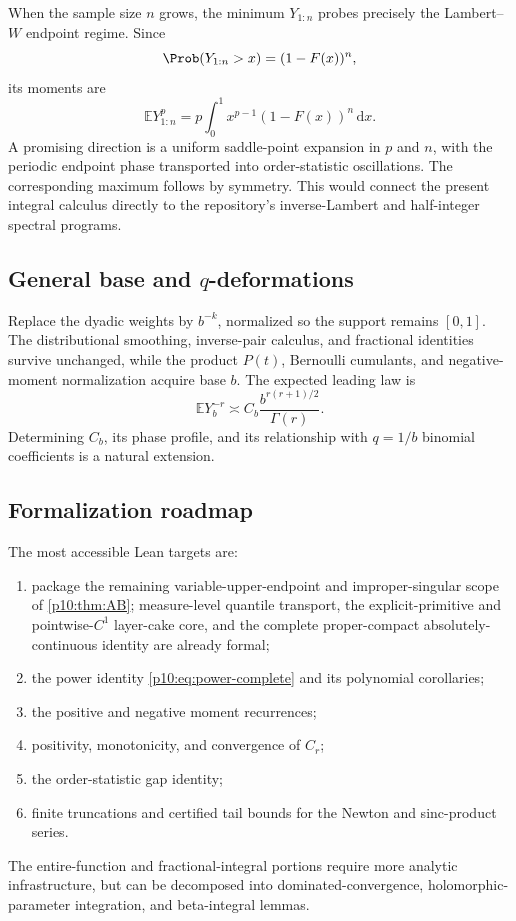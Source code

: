 \documentclass[11pt,oneside]{article}
\theoremstyle{definition}
\theoremstyle{remark}
\newcommand{\F}{F}
\newcommand{\E}{\mathbb E}
\newcommand{\dd}{\,\mathrm d}
\newcommand{\1}{\mathbf 1}
\begin{document}
When the sample size \(n\) grows, the minimum \(Y_{1:n}\) probes precisely the
Lambert--\(W\) endpoint regime.  Since
\[
 \Prob(Y_{1:n}>x)=(1-\F(x))^n,
\]
its moments are
\begin{equation}\label{p10:eq:min-order-moment}
 \E Y_{1:n}^p=p\int_0^1x^{p-1}(1-\F(x))^n\dd x.
\end{equation}
A promising direction is a uniform saddle-point expansion in \(p\) and \(n\), with the
periodic endpoint phase transported into order-statistic oscillations.  The corresponding
maximum follows by symmetry.  This would connect the present integral calculus directly
to the repository's inverse-Lambert and half-integer spectral programs.

\subsection{General base and \texorpdfstring{\(q\)}{q}-deformations}

Replace the dyadic weights by \(b^{-k}\), normalized so the support remains \([0,1]\).
The distributional smoothing, inverse-pair calculus, and fractional identities survive
unchanged, while the product \(P(t)\), Bernoulli cumulants, and negative-moment
normalization acquire base \(b\).  The expected leading law is
\begin{equation}\label{p10:eq:baseb-heuristic}
 \E Y_b^{-r}
 \asymp C_b\frac{b^{r(r+1)/2}}{\Gamma(r)}.
\end{equation}
Determining \(C_b\), its phase profile, and its relationship with \(q=1/b\) binomial
coefficients is a natural extension.

\subsection{Formalization roadmap}

The most accessible Lean targets are:
\begin{enumerate}
\item package the remaining variable-upper-endpoint and improper-singular scope of
      \cref{p10:thm:AB}; measure-level quantile transport, the explicit-primitive and
      pointwise-\(C^1\) layer-cake core, and the complete proper-compact
      absolutely-continuous identity are already formal;
\item the power identity \cref{p10:eq:power-complete} and its polynomial corollaries;
\item the positive and negative moment recurrences;
\item positivity, monotonicity, and convergence of \(C_r\);
\item the order-statistic gap identity;
\item finite truncations and certified tail bounds for the Newton and sinc-product
series.
\end{enumerate}
The entire-function and fractional-integral portions require more analytic infrastructure,
but can be decomposed into dominated-convergence, holomorphic-parameter integration,
and beta-integral lemmas.
\end{document}
